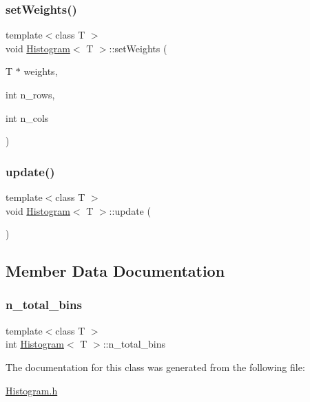 \subsubsection{\texorpdfstring{set\+Weights()}{setWeights()}}
{\footnotesize\ttfamily template$<$class T $>$ \\
void \hyperlink{class_histogram}{Histogram}$<$ T $>$\+::set\+Weights (\begin{DoxyParamCaption}\item[{T $\ast$}]{weights,  }\item[{int}]{n\+\_\+rows,  }\item[{int}]{n\+\_\+cols }\end{DoxyParamCaption})\hspace{0.3cm}{\ttfamily [inline]}}

\mbox{\label{class_histogram_aab5a07cfc09bfc0d504d58fbd8164ce3}} 
\subsubsection{\texorpdfstring{update()}{update()}}
{\footnotesize\ttfamily template$<$class T $>$ \\
void \hyperlink{class_histogram}{Histogram}$<$ T $>$\+::update (\begin{DoxyParamCaption}{ }\end{DoxyParamCaption})\hspace{0.3cm}{\ttfamily [inline]}}



\subsection{Member Data Documentation}
\mbox{\label{class_histogram_aa390028b7e8a06918cfea6b30506d803}} 
\subsubsection{\texorpdfstring{n\+\_\+total\+\_\+bins}{n\_total\_bins}}
{\footnotesize\ttfamily template$<$class T $>$ \\
int \hyperlink{class_histogram}{Histogram}$<$ T $>$\+::n\+\_\+total\+\_\+bins}



The documentation for this class was generated from the following file\+:\begin{DoxyCompactItemize}
\item 
\hyperlink{_histogram_8h}{Histogram.\+h}\end{DoxyCompactItemize}
